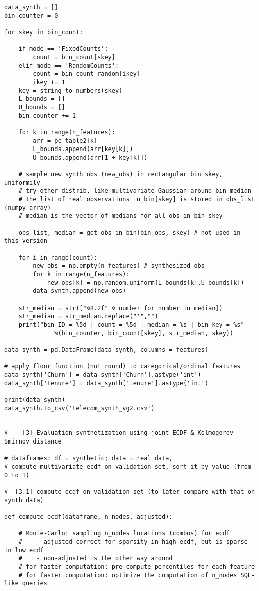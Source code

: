 \documentclass[oneside,10pt]{book}
\begin{document}
\begin{lstlisting}
data_synth = []
bin_counter = 0

for skey in bin_count:

    if mode == 'FixedCounts':
        count = bin_count[skey]
    elif mode == 'RandomCounts': 
        count = bin_count_random[ikey]
        ikey += 1
    key = string_to_numbers(skey)
    L_bounds = []
    U_bounds = []
    bin_counter += 1

    for k in range(n_features):
        arr = pc_table2[k] 
        L_bounds.append(arr[key[k]])
        U_bounds.append(arr[1 + key[k]])

    # sample new synth obs (new_obs) in rectangular bin skey, uniformily
    # try other distrib, like multivariate Gaussian around bin median 
    # the list of real observations in bin[skey] is stored in obs_list (numpy array)
    # median is the vector of medians for all obs in bin skey

    obs_list, median = get_obs_in_bin(bin_obs, skey) # not used in this version
    
    for i in range(count):        
        new_obs = np.empty(n_features) # synthesized obs
        for k in range(n_features):
            new_obs[k] = np.random.uniform(L_bounds[k],U_bounds[k])
        data_synth.append(new_obs)

    str_median = str(["%8.2f" % number for number in median])
    str_median = str_median.replace("'","")
    print("bin ID = %5d | count = %5d | median = %s | bin key = %s" 
              %(bin_counter, bin_count[skey], str_median, skey))

data_synth = pd.DataFrame(data_synth, columns = features)

# apply floor function (not round) to categorical/ordinal features
data_synth['Churn'] = data_synth['Churn'].astype('int') 
data_synth['tenure'] = data_synth['tenure'].astype('int')

print(data_synth)    
data_synth.to_csv('telecom_synth_vg2.csv')


#--- [3] Evaluation synthetization using joint ECDF & Kolmogorov-Smirnov distance

# dataframes: df = synthetic; data = real data,
# compute multivariate ecdf on validation set, sort it by value (from 0 to 1) 

#- [3.1] compute ecdf on validation set (to later compare with that on synth data)

def compute_ecdf(dataframe, n_nodes, adjusted):

    # Monte-Carlo: sampling n_nodes locations (combos) for ecdf
    #    - adjusted correct for sparsity in high ecdf, but is sparse in low ecdf  
    #    - non-adjusted is the other way around
    # for faster computation: pre-compute percentiles for each feature
    # for faster computation: optimize the computation of n_nodes SQL-like queries


\end{lstlisting}
\end{document}
